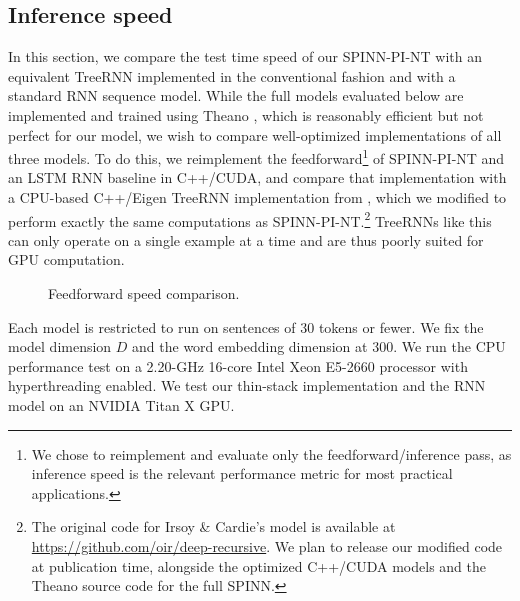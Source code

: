 \documentclass[11pt]{article}
\begin{document}
\subsection{Inference speed}
\label{sec:speed}

In this section, we compare the test time speed of our SPINN-PI-NT with an equivalent TreeRNN implemented in the conventional fashion and with a standard RNN sequence model. While the full models evaluated below are implemented and trained using Theano \citep{bergstra+al:2010-scipy,Bastien-Theano-2012}, which is reasonably efficient but not perfect for our model, we wish to compare well-optimized implementations of all three models. To do this, we reimplement the feedforward\footnote{We chose to reimplement and evaluate only the feedforward/inference pass, as inference speed is the relevant performance metric for most practical applications.} of SPINN-PI-NT and an LSTM RNN baseline in C++/CUDA, and compare that implementation with a CPU-based C++/Eigen TreeRNN implementation from \citet{irsoy2014deep}, which we modified to perform exactly the same computations as SPINN-PI-NT.\footnote{The original code for Irsoy \& Cardie's model is available at \url{https://github.com/oir/deep-recursive}. We plan to release our modified code at publication time, alongside the optimized C++/CUDA models and the Theano source code for the full SPINN.} TreeRNNs like this can only operate on a single example at a time and are thus poorly suited for GPU computation.

\begin{figure}
\centering
{}
\caption{Feedforward speed comparison.}
\label{fig:speed}
\end{figure}


Each model is restricted to run on sentences of 30 tokens or fewer. We fix the model dimension $D$ and the word embedding dimension at 300. We run the CPU performance test on a 2.20-GHz 16-core Intel Xeon E5-2660 processor with hyperthreading enabled. We test our thin-stack implementation and the RNN model on an NVIDIA Titan X GPU.
\end{document}
